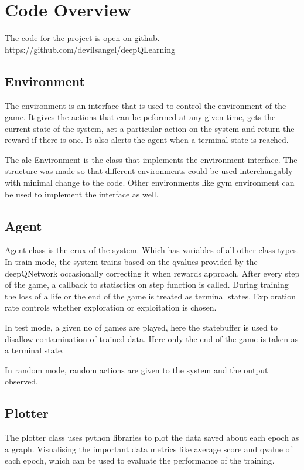 \documentclass[a4paper,12pt]{report}
\begin{document}
		\section{Code Overview}
			The code for the project is open on github. https://github.com/devilsangel/deepQLearning

			\subsection{Environment}
				The environment is an interface that is used to control the environment of the game. It gives the actions that can be peformed at any given time, gets the current state of the system, act a particular action on the system and return the reward if there is one. It also alerts the agent when a terminal state is reached.

				The \ac{ale} Environment is the class that implements the environment interface. The structure was made so that different environments could be used interchangably with minimal change to the code. Other environments like gym environment can be used to implement the interface as well.

			\subsection{Agent}
				Agent class is the crux of the system. Which has variables of all other class types. In train mode, the system trains based on the qvalues provided by the deepQNetwork occasionally correcting it when rewards approach. After every step of the game, a callback to statisctics on step function is called. During training the loss of a life or the end of the game is treated as terminal states. Exploration rate controls whether exploration or exploitation is chosen. 

				In test mode, a given no of games are played, here the statebuffer is used to disallow contamination of trained data. Here only the end of the game is taken as a terminal state.

				In random mode, random actions are given to the system and the output observed.

			\subsection{Plotter}
				The plotter class uses python libraries to plot the data saved about each epoch as a graph. Visualising the important data metrics like average score and qvalue of each epoch, which can be used to evaluate the performance of the training.
\end{document}
